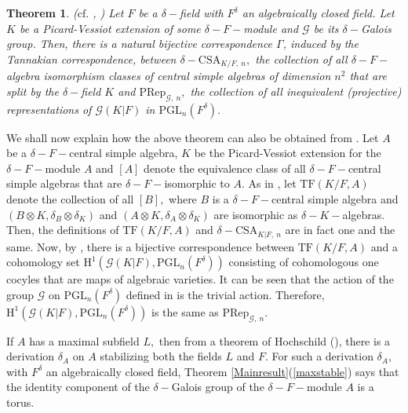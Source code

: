 \documentclass[preprint, 11pt]{amsart}
\newtheorem{theorem}{Theorem}[section]
\theoremstyle{corollary}
\theoremstyle{remark}
\theoremstyle{proposition}
\numberwithin{equation}{subsection}
\begin{document}
\begin{theorem} \label{proj-equivalence}($\mathrm{cf.}$ \cite[Theorem 4.11]{tsui-wang}, \cite[Theorem 2]{JM08}) Let $F$ be a $\delta-$field with  $F^{\delta}$ an algebraically closed field.  Let $K$ be a Picard-Vessiot extension of some $\delta-F-$module and $\mathscr G$ be its $\delta-$Galois group. Then, there is  a natural bijective correspondence $\Gamma$, induced by the Tannakian correspondence,  between $\delta-\mathrm{CSA}_{K/F, \ n},$ the collection of all $\delta-F-$algebra isomorphism classes of  central simple algebras of dimension $n^2$ that are split  by the $\delta-$field $K$ and $\mathrm{PRep}_{\mathscr G, \ n},$ the collection of all inequivalent (projective) representations of $\mathscr G(K|F)$ in $\mathrm{PGL}_n(F^\delta).$ 
\end{theorem}

We shall now explain how the above theorem can also be obtained from \cite[Theorem 4.11]{tsui-wang}. 
Let $A$ be a $\delta-F-$central simple algebra, $K$ be the Picard-Vessiot extension for the $\delta-F-$module $A$ and $[A]$ denote the equivalence class of all $\delta-F-$central simple algebras that are $\delta-F-$isomorphic to $A.$ As in \cite[Definition 3.11]{tsui-wang}, let
$\mathrm{TF}(K/F, A)$ denote the collection of all $[B],$ where  $B$ is a $\delta-F-$central simple algebra and $(B\otimes K, \delta_B\otimes \delta_K)$ and  $(A\otimes K, \delta_A\otimes \delta_K)$ are isomorphic as $\delta-K-$algebras. Then, the definitions of $\mathrm{TF}(K/F, A)$ and $\delta-\mathrm{CSA}_{K|F, \ n}$ are in fact one and the same.  Now,  by \cite[Theorem 4.11]{tsui-wang}, there is a bijective correspondence between $\mathrm{TF}(K/F, A)$ and a cohomology set $\mathrm{H}^1(\mathscr G(K|F), \mathrm{PGL}_n(F^\delta))$  consisting of cohomologous one cocyles that are maps of algebraic varieties. It can be seen that the action of the group $\mathscr G$ on  $\mathrm{PGL}_n(F^\delta)$ defined in  \cite[Remark 4.4]{tsui-wang} is the trivial action. Therefore, $\mathrm{H}^1(\mathscr G(K|F), \mathrm{PGL}_n(F^\delta))$ is the same as $\mathrm{PRep}_{\mathscr G, \ n}.$ 


If $A$ has a maximal subfield $L,$ then from a theorem of Hochschild  (\cite[Theorem 6]{Hoc55}), there is a derivation $\delta_A$ on $A$ stabilizing both  the fields $L$ and $F.$    For such a derivation $\delta_A,$ with $F^{\delta}$ an algebraically closed field,  Theorem \ref{Mainresult}(\ref{maxstable}) says that the identity component of the $\delta-$Galois group of the $\delta-F-$module $A$ is a torus. 
\end{document}

